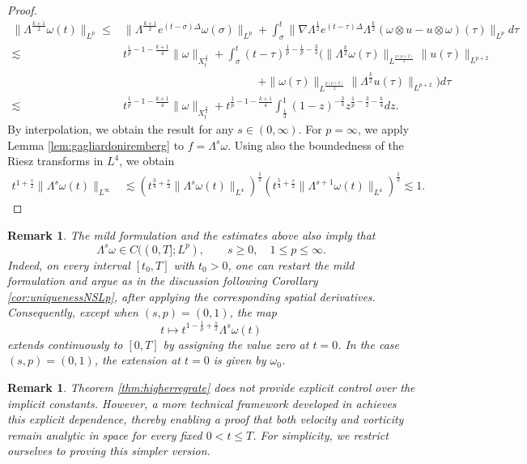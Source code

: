 \documentclass[11pt,a4paper]{article}
\newcommand{\w}{\omega}
\newcommand{\na}{\nabla}
\def\heat#1{e^{#1 \Delta}}
\newtheorem{rem}[thm]{Remark}
\begin{document}
\begin{proof}
$$
\begin{aligned}
\|\Lambda^\frac{k+1}{2}\w(t)\|_{L^p}\leq& \|\Lambda^\frac{k+1}{2}\heat{(t-\sigma)}\w(\sigma)\|_{L^p}+\int_\sigma^t\|\na\Lambda^{\frac{1}{2}}\heat{(t-\tau)}\Lambda^\frac{k}{2}(\w\otimes u-u\otimes \w)(\tau)\|_{L^p}d\tau\\
\lesssim & t^{\frac{1}{p}-1-\frac{k+1}{4}}\|\omega\|_{X_t^{\frac{4}{3}}}+\int_\sigma^t (t-\tau)^{\frac{1}{p}-\frac{1}{p}-\frac{3}{4}}\big(\|\Lambda^\frac{k}{2}\w(\tau)\|_{L^{\frac{p(p+2)}{2}}}\|u(\tau)\|_{L^{p+2}}\\
&\hspace{5cm}+\|\w(\tau)\|_{L^{\frac{p(p+2)}{2}}}\|\Lambda^\frac{k}{2}u(\tau)\|_{L^{p+2}}\big)d\tau\\
\lesssim & t^{\frac{1}{p}-1-\frac{k+1}{4}}\|\omega\|_{X_t^{\frac{4}{3}}}+ t^{\frac{1}{p}-1-\frac{k+1}{4}}\int_{\frac{1}{3}}^1 (1-z)^{-\frac{3}{4}}z^{\frac{1}{p}-\frac{3}{2}-\frac{k}{4}}dz.
\end{aligned}$$
By interpolation, we obtain the result for any $s\in(0,\infty)$. 
For $p=\infty$, we apply Lemma \ref{lem:gagliardoniremberg} to
$f=\Lambda^s\omega$. Using also the boundedness of the Riesz
transforms in $L^4$, we obtain
$$
\begin{aligned}
t^{1+\frac s2}\|\Lambda^s\omega(t)\|_{L^\infty}
&\lesssim
\left(
t^{\frac34+\frac s2}
\|\Lambda^s\omega(t)\|_{L^4}
\right)^{\frac12}
\left(
t^{\frac54+\frac s2}
\|\Lambda^{s+1}\omega(t)\|_{L^4}
\right)^{\frac12}\lesssim 1.
\end{aligned}
$$
\end{proof}

\begin{rem}\label{rem:timecontinuity}
The mild formulation and the estimates above also imply that
$$
\Lambda^s\omega\in C((0,T];L^p),
\qquad s\geq0,\quad 1\leq p\leq \infty.
$$
Indeed, on every interval $[t_0,T]$ with $t_0>0$, one can restart
the mild formulation and argue as in
the discussion following Corollary \ref{cor:uniquenessNSLp}, after applying the corresponding
spatial derivatives. Consequently, except when $(s,p)=(0,1)$, the map
$$
t\longmapsto t^{1-\frac1p+\frac s2}\Lambda^s\omega(t)
$$
extends continuously to $[0,T]$ by assigning the value zero at
$t=0$. In the case $(s,p)=(0,1)$, the extension at $t=0$ is given by
$\omega_0$.
\end{rem}

\begin{rem}
Theorem \ref{thm:higherregrate} does not provide explicit control over the implicit constants. However, a more technical framework developed in \cite{dongli2009} achieves this explicit dependence, thereby enabling a proof that both velocity and vorticity remain analytic in space for every fixed $0 < t \leq T$. For simplicity, we restrict ourselves to proving this simpler version.
\end{rem}
\end{document}
